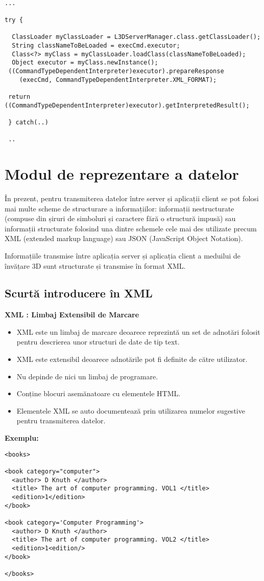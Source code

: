 \begin{verbatim}

...

try {

  ClassLoader myClassLoader = L3DServerManager.class.getClassLoader();
  String classNameToBeLoaded = execCmd.executor;
  Class<?> myClass = myClassLoader.loadClass(classNameToBeLoaded);
  Object executor = myClass.newInstance();
 ((CommandTypeDependentInterpreter)executor).prepareResponse 
 	(execCmd, CommandTypeDependentInterpreter.XML_FORMAT);
 
 return ((CommandTypeDependentInterpreter)executor).getInterpretedResult();
 
 } catch(..)
 
 ..
\end{verbatim}

\section{Modul de reprezentare a datelor}
\par În prezent, pentru transmiterea datelor între server și aplicații client se pot folosi mai multe scheme de structurare a informațiilor: informații nestructurate (compuse din șiruri de simboluri și caractere fără o structură impusă) sau informații structurate folosind una dintre schemele cele mai des utilizate precum XML (extended markup language) sau JSON (JavaScript Object Notation).
\par Informațiile transmise între aplicația server și aplicația client a meduilui de învățare 3D sunt structurate și transmise în format XML.
\subsection{Scurtă introducere în XML}\cite{C03} 

\textbf{XML : Limbaj Extensibil de Marcare}
\begin{itemize}
\item XML este un limbaj de marcare deoarece reprezintă un set de adnotări folosit pentru descrierea unor structuri de date de tip text.
\item XML este extensibil deoarece adnotările pot fi definite de către utilizator.
\item Nu depinde de nici un limbaj de programare.
\item Conține blocuri asemănatoare cu elementele HTML.
\item Elementele XML se auto documentează prin utilizarea numelor sugestive pentru transmiterea datelor.
\end{itemize}
\par \textbf{ Exemplu: }
\begin{verbatim}
<books>

<book category="computer">
  <author> D Knuth </author>
  <title> The art of computer programming. VOL1 </title>
  <edition>1</edition>
</book>

<book category='Computer Programming'>
  <author> D Knuth </author>
  <title> The art of computer programming. VOL2 </title>
  <edition>1<edition/>
</book>

</books>
\end{verbatim}

